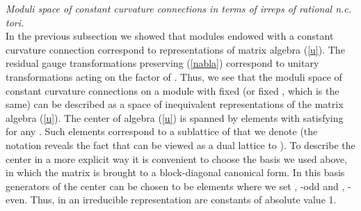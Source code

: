 \documentclass[a4paper,a4paper]{article}
\begin{document}
{\it Moduli space of constant curvature connections in terms of irreps of rational n.c. tori.}\\
In the previous subsection we showed that modules endowed with a constant curvature connection correspond to  representations of 
matrix algebra (\ref{u}). The residual gauge transformations preserving (\ref{nabla}) correspond to \coordHE{} 
unitary transformations acting on the \coordHE{} factor  of \coordHE{}. Thus, we see that the moduli space of 
 constant curvature connections on a module with fixed \coordHE{} (or fixed \coordHE{}, 
which is the same)  can be described as a space of inequivalent representations of the matrix algebra (\ref{u}).
 The center of algebra  (\ref{u}) is spanned by elements \coordHE{} with \coordHE{} satisfying 
\coordHE{} for any \coordHE{}. Such elements correspond to a sublattice of \coordHE{} that we denote \coordHE{} 
(the notation reveals the fact that \coordHE{} can be viewed as a dual lattice to \coordHE{}). 
To describe the center in a more explicit way it is convenient to choose the basis we used above, in which the matrix  \coordHE{} 
is brought to a block-diagonal canonical form. 
In this basis  generators of the center can be chosen to be elements  \coordHE{} where we set 
 \coordHE{}, \coordHE{}-odd and  \coordHE{}, \coordHE{}-even.
Thus, in an irreducible 
representation \coordHE{} are constants of absolute value 1. 
\end{document}
